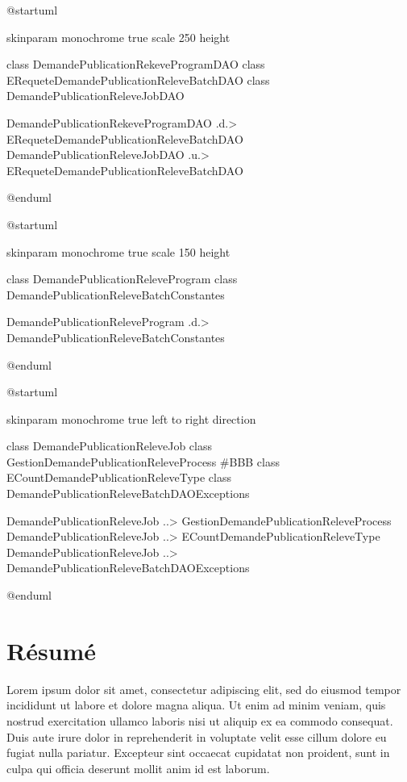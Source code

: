 \documentclass[a4paper, 12pt]{report}
\begin{document}
\begin{center}
  \begin{plantuml}
    @startuml

    skinparam monochrome true
    scale 250 height

    class DemandePublicationRekeveProgramDAO
    class ERequeteDemandePublicationReleveBatchDAO
    class DemandePublicationReleveJobDAO

    DemandePublicationRekeveProgramDAO .d.> ERequeteDemandePublicationReleveBatchDAO
    DemandePublicationReleveJobDAO .u.> ERequeteDemandePublicationReleveBatchDAO

    @enduml
  \end{plantuml}
\end{center}
\begin{center}
  \begin{plantuml}
    @startuml

    skinparam monochrome true
    scale 150 height

    class DemandePublicationReleveProgram
    class DemandePublicationReleveBatchConstantes

    DemandePublicationReleveProgram .d.> DemandePublicationReleveBatchConstantes

    @enduml
  \end{plantuml}
\end{center}
\begin{center}
  \begin{plantuml}
    @startuml

    skinparam monochrome true
    left to right direction

    class DemandePublicationReleveJob
    class GestionDemandePublicationReleveProcess #BBB
    class ECountDemandePublicationReleveType
    class DemandePublicationReleveBatchDAOExceptions

    DemandePublicationReleveJob ..> GestionDemandePublicationReleveProcess
    DemandePublicationReleveJob ..> ECountDemandePublicationReleveType
    DemandePublicationReleveJob ..> DemandePublicationReleveBatchDAOExceptions

    @enduml
  \end{plantuml}
\end{center}

\tableofcontents
\thispagestyle{empty}

\chapter*{Résumé}
\thispagestyle{empty}

Lorem ipsum dolor sit amet, consectetur adipiscing elit, sed do eiusmod tempor incididunt ut labore et dolore magna aliqua. Ut enim ad minim veniam, quis nostrud exercitation ullamco laboris nisi ut aliquip ex ea commodo consequat. Duis aute irure dolor in reprehenderit in voluptate velit esse cillum dolore eu fugiat nulla pariatur. Excepteur sint occaecat cupidatat non proident, sunt in culpa qui officia deserunt mollit anim id est laborum.
\end{document}
